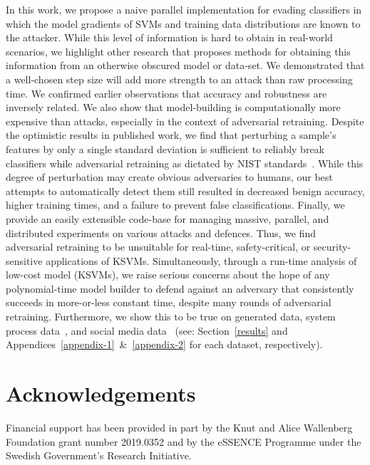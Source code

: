 \documentclass[fonts]{icst}
\begin{document}
In this work, we propose a naive parallel implementation for evading classifiers in which the model gradients of SVMs and training data distributions are known to the attacker.
While this level of information is hard to obtain in real-world scenarios, we highlight other research that proposes methods for obtaining this information from an otherwise obscured model or data-set.
We demonstrated that a   well-chosen step size will add more strength to an attack than raw processing time.
We confirmed earlier observations that accuracy and robustness are inversely related.
We also show that model-building is computationally more expensive than attacks, especially in the context of adversarial retraining.
Despite the optimistic results in published work, we find that perturbing a sample's features by only a single standard deviation is sufficient to reliably break classifiers while adversarial retraining as dictated by NIST standards~\cite{falco2006using}.
While this degree of perturbation may create obvious adversaries to humans, our best attempts to automatically detect them still resulted in decreased benign accuracy, higher training times, and a failure to prevent false classifications.
Finally, we provide an easily extensible code-base for managing massive, parallel, and distributed experiments on various attacks and defences.
Thus, we find adversarial retraining to be unsuitable for real-time, safety-critical, or security-sensitive applications of KSVMs.
Simultaneously, through a run-time analysis of low-cost model (KSVMs), we raise serious concerns about the hope of any polynomial-time model builder to defend against an adversary that consistently succeeds in more-or-less constant time, despite many rounds of adversarial retraining.
Furthermore, we show this to be true on generated data, system process data~\cite{kdd-nsl}, and social media data~\cite{truthseeker} (see: Section~\ref{results} and Appendices~\ref{appendix-1}~\&~\ref{appendix-2} for each dataset, respectively).

\section{Acknowledgements}
Financial support has been provided in part by the Knut and Alice Wallenberg Foundation grant number 2019.0352 and by the eSSENCE Programme under the Swedish Government's Research Initiative.



\end{document}
